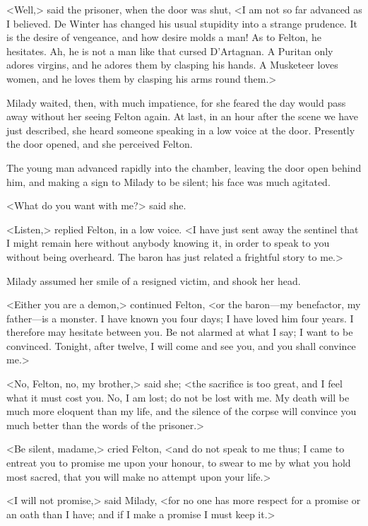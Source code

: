 <Well,> said the prisoner, when the door was shut, <I am not so far advanced as I believed. De Winter has changed his usual stupidity into a strange prudence. It is the desire of vengeance, and how desire molds a man! As to Felton, he hesitates. Ah, he is not a man like that cursed D'Artagnan. A Puritan only adores virgins, and he adores them by clasping his hands. A Musketeer loves women, and he loves them by clasping his arms round them.> 

Milady waited, then, with much impatience, for she feared the day would pass away without her seeing Felton again. At last, in an hour after the scene we have just described, she heard someone speaking in a low voice at the door. Presently the door opened, and she perceived Felton. 

The young man advanced rapidly into the chamber, leaving the door open behind him, and making a sign to Milady to be silent; his face was much agitated. 

<What do you want with me?> said she. 

<Listen,> replied Felton, in a low voice. <I have just sent away the sentinel that I might remain here without anybody knowing it, in order to speak to you without being overheard. The baron has just related a frightful story to me.> 

Milady assumed her smile of a resigned victim, and shook her head. 

<Either you are a demon,> continued Felton, <or the baron—my benefactor, my father—is a monster. I have known you four days; I have loved him four years. I therefore may hesitate between you. Be not alarmed at what I say; I want to be convinced. Tonight, after twelve, I will come and see you, and you shall convince me.> 

<No, Felton, no, my brother,> said she; <the sacrifice is too great, and I feel what it must cost you. No, I am lost; do not be lost with me. My death will be much more eloquent than my life, and the silence of the corpse will convince you much better than the words of the prisoner.> 

<Be silent, madame,> cried Felton, <and do not speak to me thus; I came to entreat you to promise me upon your honour, to swear to me by what you hold most sacred, that you will make no attempt upon your life.> 

<I will not promise,> said Milady, <for no one has more respect for a promise or an oath than I have; and if I make a promise I must keep it.> 

